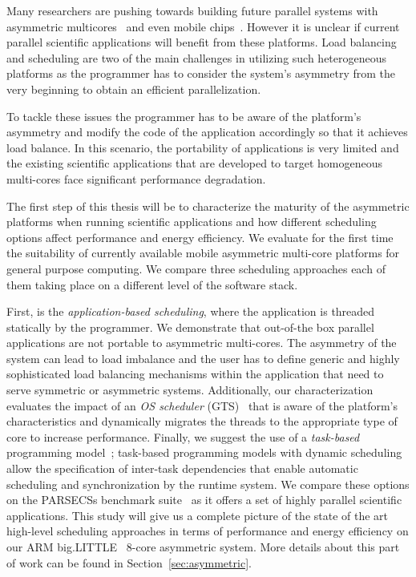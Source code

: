 Many researchers are pushing towards building future parallel systems with asymmetric multicores~\cite{Suleman:APLOS2009,Fedorova2009, Greenhalgh2011, Joao:ASPLOS2012,Joao:ISCA2013} and even mobile chips~\cite{ARM4HPC_SC13}. 
However it is unclear if current parallel scientific applications will benefit from these platforms.
Load balancing and scheduling are two of the main challenges in utilizing such heterogeneous platforms as the programmer has to consider the system's asymmetry from the very beginning to obtain an efficient parallelization. 

To tackle these issues the programmer has to be aware of the platform's asymmetry and modify the code of the application accordingly so that it achieves load balance. 
In this scenario, the portability of applications is very limited and the existing scientific applications that are developed to target homogeneous multi-cores face significant performance degradation. 

The first step of this thesis will be to characterize the maturity of the asymmetric platforms when running scientific applications and how different scheduling options affect performance and energy efficiency.
We evaluate for the first time the suitability of currently available mobile asymmetric multi-core platforms for general purpose computing. 
We compare three scheduling approaches each of them taking place on a different level of the software stack. 

First, is the \textit{application-based scheduling}, where the application is threaded statically by the programmer. 
We demonstrate that out-of-the box parallel applications are not portable to asymmetric multi-cores.
The asymmetry of the system can lead to load imbalance and the user has to define generic and highly sophisticated load balancing mechanisms within the application that need to serve symmetric or asymmetric systems. 
Additionally, our characterization evaluates the impact of an \textit{OS scheduler} (GTS)~\cite{samsung} that is aware of the platform's characteristics and dynamically migrates the threads to the appropriate type of core to increase performance.
Finally, we suggest the use of a \textit{task-based} programming model~\cite{OpenMP4.0:Manual2013, OmpSs_PPL11, Zuckerman:EXADAPT2011, Bauer.2012.SC, Vandierendonck:PACT2011};
task-based programming models with dynamic scheduling allow the specification of inter-task dependencies that enable automatic scheduling and synchronization by the runtime system.
We compare these options on the PARSECSs benchmark suite~\cite{Chasapis:TACO2016} as it offers a set of highly parallel scientific applications.
This study will give us a complete picture of the state of the art high-level scheduling approaches in terms of performance and energy efficiency on our ARM big.LITTLE~\cite{ARM} 8-core asymmetric system.
More details about this part of work can be found in Section~\ref{sec:asymmetric}.

